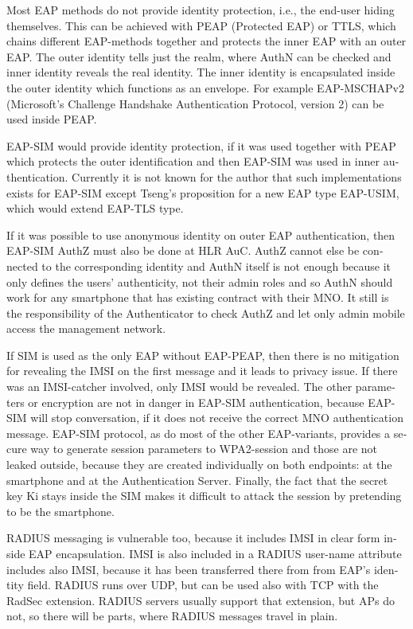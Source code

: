 \documentclass[12pt,a4paper,english]{tutthesis}
\begin{document}
\begin{otherlanguage}{english}
{Most EAP methods do not provide identity protection, i.e., the
end-user hiding themselves.
This can be achieved with PEAP (Protected EAP) or TTLS, which
chains different EAP-methods together and protects the inner EAP with
an outer EAP. 
The outer identity tells just the realm, where AuthN can be checked
and inner identity reveals the real identity.  The inner identity is
encapsulated inside the outer identity which functions as an
envelope. 
For example EAP-MSCHAPv2 (Microsoft's Challenge
Handshake Authentication Protocol, version 2) can be used inside PEAP.


EAP-SIM would provide identity protection, if it was used together
with PEAP which protects the outer identification  and
then EAP-SIM was used in inner authentication.
Currently it is not known for the author that such implementations exists for
EAP-SIM  except Tseng's proposition\cite{tseng-usim} for a new EAP type
EAP-USIM, which would extend EAP-TLS type.

If it was possible to use anonymous identity on outer EAP
authentication, then EAP-SIM AuthZ must also be done at HLR AuC.
AuthZ cannot else be connected to the corresponding
identity and AuthN itself is not enough because it only defines the users'
authenticity, not their admin roles and so 
AuthN should work for any  smartphone that has existing contract with
their MNO. 
It still is the responsibility of the Authenticator to 
check AuthZ  and let only admin mobile access the management network.

If SIM is used as the only EAP without EAP-PEAP, then there is no
mitigation for revealing the IMSI on the first message and it leads to
privacy issue.  If there was an IMSI-catcher involved, only IMSI would
be revealed.  The other parameters or encryption are not in danger in
EAP-SIM authentication, because EAP-SIM will stop conversation, if it
does not receive the correct MNO authentication message.  EAP-SIM
protocol, as do most of the other EAP-variants, provides a secure way
to generate session parameters to WPA2-session and those are not
leaked outside, because they are created individually on both
endpoints: at the smartphone and at the Authentication Server.
Finally, the fact that the secret key Ki stays inside the SIM makes it
difficult to attack the session by pretending to be the smartphone.






RADIUS messaging is vulnerable too, because it includes IMSI in clear form 
inside EAP encapsulation. IMSI is also included in a RADIUS user-name
attribute includes also IMSI, because it has been transferred there from
from EAP's identity field.
RADIUS runs over UDP, but can be used also with TCP with the RadSec
extension. RADIUS servers usually support that extension, but APs do not, so 
there will be parts, where RADIUS messages travel in plain.




}
\end{otherlanguage}
\end{document}
